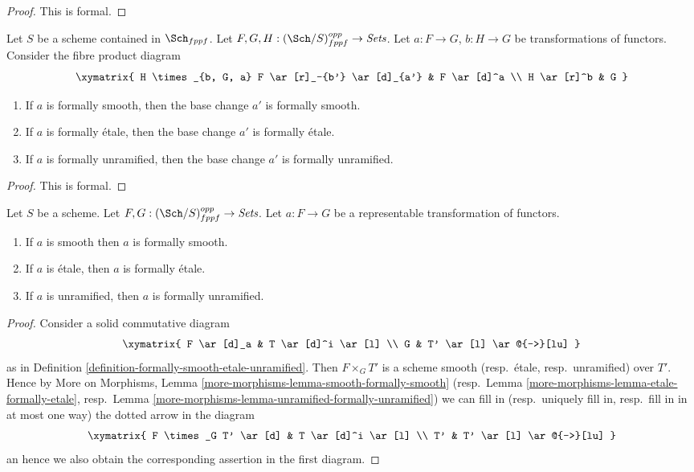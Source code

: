 \begin{proof}
This is formal.
\end{proof}

\begin{lemma}
\label{lemma-base-change-formally-smooth-etale-unramified}
Let $S$ be a scheme contained in $\Sch_{fppf}$.
Let $F, G, H : (\Sch/S)_{fppf}^{opp} \to \textit{Sets}$.
Let $a : F \to G$, $b : H \to G$ be transformations of functors.
Consider the fibre product diagram
$$
\xymatrix{
H \times_{b, G, a} F \ar[r]_-{b'} \ar[d]_{a'} & F \ar[d]^a \\
H \ar[r]^b & G
}
$$
\begin{enumerate}
\item If $a$ is formally smooth, then the base change $a'$ is
formally smooth.
\item If $a$ is formally \'etale, then the base change $a'$ is
formally \'etale.
\item If $a$ is formally unramified, then the base change $a'$ is
formally unramified.
\end{enumerate}
\end{lemma}

\begin{proof}
This is formal.
\end{proof}

\begin{lemma}
\label{lemma-representable-property-formally-property}
Let $S$ be a scheme.
Let $F, G : (\Sch/S)_{fppf}^{opp} \to \textit{Sets}$.
Let $a : F \to G$ be a representable transformation of functors.
\begin{enumerate}
\item If $a$ is smooth then $a$ is formally smooth.
\item If $a$ is \'etale, then $a$ is formally \'etale.
\item If $a$ is unramified, then $a$ is formally unramified.
\end{enumerate}
\end{lemma}

\begin{proof}
Consider a solid commutative diagram
$$
\xymatrix{
F \ar[d]_a & T \ar[d]^i \ar[l] \\
G & T' \ar[l] \ar@{-->}[lu]
}
$$
as in
Definition \ref{definition-formally-smooth-etale-unramified}.
Then $F \times_G T'$ is a scheme smooth (resp.\ \'etale, resp.\ unramified)
over $T'$. Hence by
More on Morphisms, Lemma \ref{more-morphisms-lemma-smooth-formally-smooth}
(resp.\ Lemma \ref{more-morphisms-lemma-etale-formally-etale},
resp.\ Lemma \ref{more-morphisms-lemma-unramified-formally-unramified})
we can fill in (resp.\ uniquely fill in, resp.\ fill in in at most
one way) the dotted arrow in the diagram
$$
\xymatrix{
F \times_G T' \ar[d] & T \ar[d]^i \ar[l] \\
T' & T' \ar[l] \ar@{-->}[lu]
}
$$
an hence we also obtain the corresponding assertion in the first diagram.
\end{proof}

